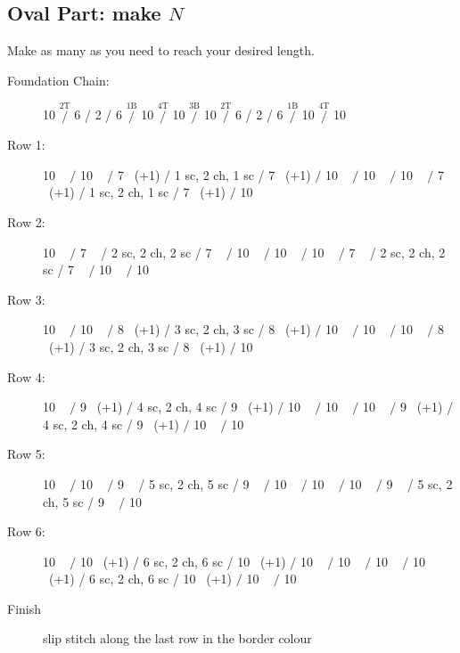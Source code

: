 \documentclass[openany]{book}
\newcommand{\ch}{}%
\renewcommand{\sc}{}%
\newcommand{\m}[1]{$\stackrel{{\text{#1}}}{/}$}
\begin{document}



\subsection*{Oval Part: make $N$}
Make as many as you need to reach your desired length.

\begin{description}
\item[Foundation Chain:]
10 \ch \m{2T}
6 \ch /  2 \ch /  6 \m{1B}
10 \ch \m{4T}
10 \ch \m{3B}
10 \ch \m{2T}
6 \ch /  2 \ch /  6 \m{1B}
10 \ch \m{4T}
10 \ch 
\item[Row 1:]
10 \sc~ \m{}
10 \sc~ \m{}
7 \sc~(+1) /  1 sc, 2 ch, 1 sc /  7 \sc~(+1) \m{}
10 \sc~ \m{}
10 \sc~ \m{}
10 \sc~ \m{}
7 \sc~(+1) /  1 sc, 2 ch, 1 sc /  7 \sc~(+1) \m{}
10 \sc~ 
\item[Row 2:]
10 \sc~ \m{}
7 \sc~ /  2 sc, 2 ch, 2 sc /  7 \sc~ \m{}
10 \sc~ \m{}
10 \sc~ \m{}
10 \sc~ \m{}
7 \sc~ /  2 sc, 2 ch, 2 sc /  7 \sc~ \m{}
10 \sc~ \m{}
10 \sc~ 
\item[Row 3:]
10 \sc~ \m{}
10 \sc~ \m{}
8 \sc~(+1) /  3 sc, 2 ch, 3 sc /  8 \sc~(+1) \m{}
10 \sc~ \m{}
10 \sc~ \m{}
10 \sc~ \m{}
8 \sc~(+1) /  3 sc, 2 ch, 3 sc /  8 \sc~(+1) \m{}
10 \sc~ 
\item[Row 4:]
10 \sc~ \m{}
9 \sc~(+1) /  4 sc, 2 ch, 4 sc /  9 \sc~(+1) \m{}
10 \sc~ \m{}
10 \sc~ \m{}
10 \sc~ \m{}
9 \sc~(+1) /  4 sc, 2 ch, 4 sc /  9 \sc~(+1) \m{}
10 \sc~ \m{}
10 \sc~ 
\item[Row 5:]
10 \sc~ \m{}
10 \sc~ \m{}
9 \sc~ /  5 sc, 2 ch, 5 sc /  9 \sc~ \m{}
10 \sc~ \m{}
10 \sc~ \m{}
10 \sc~ \m{}
9 \sc~ /  5 sc, 2 ch, 5 sc /  9 \sc~ \m{}
10 \sc~ 
\item[Row 6:]
10 \sc~ \m{}
10 \sc~(+1) /  6 sc, 2 ch, 6 sc /  10 \sc~(+1) \m{}
10 \sc~ \m{}
10 \sc~ \m{}
10 \sc~ \m{}
10 \sc~(+1) /  6 sc, 2 ch, 6 sc /  10 \sc~(+1) \m{}
10 \sc~ \m{}
10 \sc~
 \item[Finish] slip stitch along the last row in the border colour
\end{description}
\end{document}
